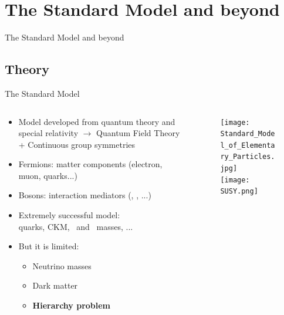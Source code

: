 \section[Theory]{The Standard Model and beyond}
\setcounter{tocdepth}{2}

\begin{frame}
\begin{center}
The Standard Model and beyond
\end{center}
\end{frame}

\subsection{Theory}
\begin{frame}{The Standard Model}
\vspace{-.2cm}
\begin{columns}

\begin{column}{.50\textwidth}
\begin{block}{}
\begin{itemize}\scriptsize
\item Model developed from quantum theory and special relativity $\to$ Quantum Field Theory + Continuous group symmetries
\item Fermions: matter components (electron, muon, quarks...)
\item Bosons: interaction mediators (\W, \Z, ...)
\item Extremely successful model: \\ quarks, CKM, \W~and \Z~masses, ...
\item But it is limited:
  \begin{itemize}\scriptsize
  \item Neutrino masses
  \item Dark matter
  \item \textbf{Hierarchy problem}
  \end{itemize}
\end{itemize}
\end{block}
\end{column}

\begin{column}{.50\textwidth}
\begin{figure}[!Hhtbp]
  \begin{center}
    \texttt{[image: Standard\_Model\_of\_Elementary\_Particles.jpg]}\\
    \vspace{.6cm}
    \texttt{[image: SUSY.png]}
  \end{center}
\end{figure}
\end{column}
\end{columns}
\end{frame}
